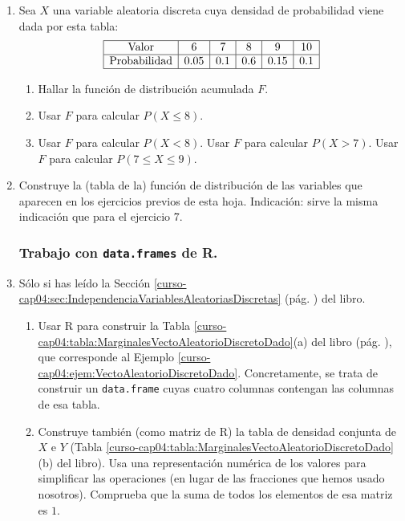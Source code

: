 \documentclass[10pt,a4paper]{article}\usepackage[]{graphicx}\usepackage[]{color}
\newcounter {cont01}
\begin{document}
\begin{enumerate}
    \item Sea $X$ una variable aleatoria discreta cuya densidad de
        probabilidad viene dada por esta tabla:
    \[
    \begin{array}{|c|c|c|c|c|c|}
    \hline
    \mbox{Valor}&6&7&8&9&10\\
    \hline
    \mbox{Probabilidad}&0.05&0.1&0.6&0.15&0.1\\
    \hline
    \end{array}
    \]
        \begin{enumerate}
          \item Hallar la función de distribución acumulada $F$.
          \item Usar $F$ para calcular $P(X\leq 8)$.
          \item Usar $F$ para calcular $P(X< 8)$. Usar $F$ para calcular $P(X>7)$.
              Usar $F$ para calcular $P(7\leq X\leq 9)$.
        \end{enumerate}


    \item Construye la (tabla de la) función de distribución de las variables que aparecen en los ejercicios previos de esta hoja. Indicación:
        sirve la misma indicación que para el ejercicio 7.

\subsubsection*{Trabajo con {\tt data.frames} de R.}


  \item Sólo si has leído la Sección \ref{curso-cap04:sec:IndependenciaVariablesAleatoriasDiscretas} (pág. \pageref{curso-cap04:sec:IndependenciaVariablesAleatoriasDiscretas}) del libro.\\
      \begin{enumerate}
        \item Usar R para construir la Tabla \ref{curso-cap04:tabla:MarginalesVectoAleatorioDiscretoDado}(a) del libro (pág. \pageref{curso-cap04:tabla:MarginalesVectoAleatorioDiscretoDado}), que corresponde al Ejemplo \ref{curso-cap04:ejem:VectoAleatorioDiscretoDado}. Concretamente, se trata de construir un {\tt data.frame} cuyas cuatro columnas contengan las columnas de esa tabla.

        \item Construye también (como matriz de R) la tabla de densidad conjunta de $X$ e $Y$ (Tabla \ref{curso-cap04:tabla:MarginalesVectoAleatorioDiscretoDado}(b) del libro). Usa una representación numérica de los valores para simplificar las operaciones (en lugar de las fracciones que hemos usado nosotros). Comprueba que la suma de todos los elementos de esa matriz es $1$.


\end{enumerate}
\end{enumerate}
\end{document}
